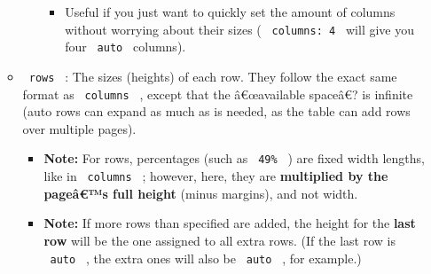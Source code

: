 \begin{enumerate}
\begin{itemize}
\begin{itemize}
      \begin{itemize}
      \tightlist
      \item
        Useful if you just want to quickly set the amount of columns
        without worrying about their sizes ( \texttt{\ columns:\ 4\ }
        will give you four \texttt{\ auto\ } columns).
      \end{itemize}
    \end{itemize}
  \item
    \texttt{\ rows\ } : The sizes (heights) of each row. They follow the
    exact same format as \texttt{\ columns\ } , except that the
    â€œavailable spaceâ€? is infinite (auto rows can expand as much as
    is needed, as the table can add rows over multiple pages).

    \begin{itemize}
    \tightlist
    \item
      \textbf{Note:} For rows, percentages (such as \texttt{\ 49\%\ } )
      are fixed width lengths, like in \texttt{\ columns\ } ; however,
      here, they are \textbf{multiplied by the pageâ€™s full height}
      (minus margins), and not width.
    \item
      \textbf{Note:} If more rows than specified are added, the height
      for the \textbf{last row} will be the one assigned to all extra
      rows. (If the last row is \texttt{\ auto\ } , the extra ones will
      also be \texttt{\ auto\ } , for example.)


\end{itemize}
\end{itemize}
\end{enumerate}
